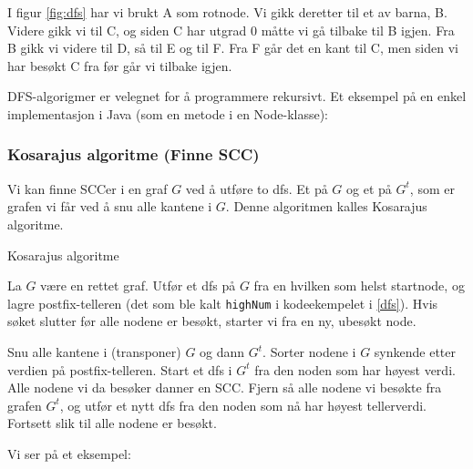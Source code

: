 I figur \ref{fig:dfs} har vi brukt A som rotnode. Vi gikk deretter til et av barna, B. Videre gikk vi til C, og siden C har utgrad 0 måtte vi gå tilbake til B igjen. Fra B gikk vi videre til D, så til E og til F. Fra F går det en kant til C, men siden vi har besøkt C fra før går vi tilbake igjen. 

DFS-algorigmer er velegnet for å programmere rekursivt. Et eksempel på en enkel implementasjon i Java (som en metode i en Node-klasse):

\newpage

\subsubsection{Kosarajus algoritme (Finne SCC)}
Vi kan finne SCCer i en graf $ G $ ved å utføre to dfs. Et på $ G $ og et på $ G^t $, som er grafen vi får ved å snu alle kantene i $ G $. Denne algoritmen kalles Kosarajus algoritme.

\begin{teorem} Kosarajus algoritme

La $ G $ være en rettet graf. Utfør et dfs på $ G $ fra en hvilken som helst startnode, og lagre postfix-telleren (det som ble kalt \verb|highNum| i kodeekempelet i \ref{dfs}). Hvis søket slutter før alle nodene er besøkt, starter vi fra en ny, ubesøkt node.

Snu alle kantene i (transponer) $ G $ og dann $ G^t $. Sorter nodene i $ G $ synkende etter verdien på postfix-telleren. Start et dfs i $ G^t $ fra den noden som har høyest verdi. Alle nodene vi da besøker danner en SCC. Fjern så alle nodene vi besøkte fra grafen $ G^t $, og utfør et nytt dfs fra den noden som nå har høyest tellerverdi. Fortsett slik til alle nodene er besøkt. 
\end{teorem}


\noindent Vi ser på et eksempel:

